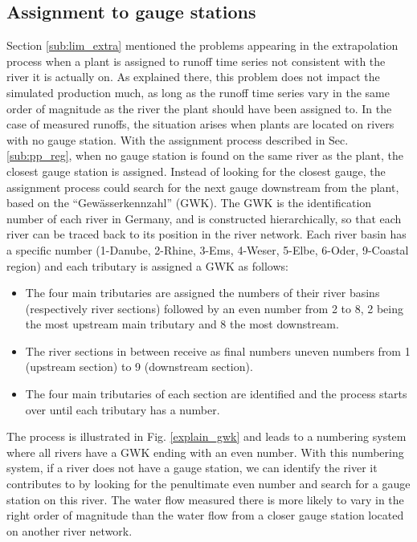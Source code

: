 \subsection{Assignment to gauge stations}
\label{sub:imp_assign_gauge}
Section \ref{sub:lim_extra} mentioned the problems appearing in the extrapolation process when a plant is assigned to runoff time series not consistent with the river it is actually on. As explained there, this problem does not impact the simulated production much, as long as the runoff time series vary in the same order of magnitude as the river the plant should have been assigned to. In the case of measured runoffs, the situation arises when plants are located on rivers with no gauge station. With the assignment process described in Sec. \ref{sub:pp_reg}, when no gauge station is found on the same river as the plant, the closest gauge station is assigned. \newline
Instead of looking for the closest gauge, the assignment process could search for the next gauge downstream from the plant, based on the ``Gewässerkennzahl'' (GWK). The GWK is the identification number of each river in Germany, and is constructed hierarchically, so that each river can be traced back to its position in the river network. Each river basin has a specific number (1-Danube, 2-Rhine, 3-Ems, 4-Weser, 5-Elbe, 6-Oder, 9-Coastal region) and each tributary is assigned a GWK as follows:
\begin{itemize}
 \item The four main tributaries are assigned the numbers of their river basins (respectively river sections) followed by an even number from 2 to 8, 2 being the most upstream main tributary and 8 the most downstream.
 \item The river sections in between receive as final numbers uneven numbers from 1 (upstream section) to 9 (downstream section).
 \item The four main tributaries of each section are identified and the process starts over until each tributary has a number.
\end{itemize}
The process is illustrated in Fig. \ref{explain_gwk} and leads to a numbering system where all rivers have a GWK ending with an even number. With this numbering system, if a river does not have a gauge station, we can identify the river it contributes to by looking for the penultimate even number and search for a gauge station on this river. The water flow measured there is more likely to vary in the right order of magnitude than the water flow from a closer gauge station located on another river network.

